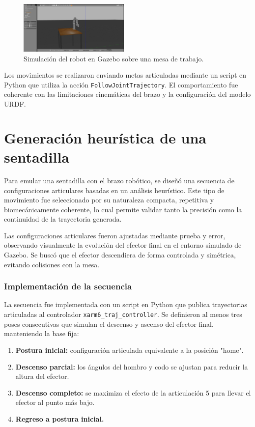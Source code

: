 \documentclass[conference]{IEEEtran}
\begin{document}
\begin{figure}[H]
    \centering
    \includegraphics[width=0.48\textwidth]{images/home.png}
    \caption{Simulación del robot en Gazebo sobre una mesa de trabajo.}
    \label{fig:gazebo_home}
\end{figure}

Los movimientos se realizaron enviando metas articuladas mediante un script en Python que utiliza la acción \texttt{FollowJointTrajectory}. El comportamiento fue coherente con las limitaciones cinemáticas del brazo y la configuración del modelo URDF.

\section{Generación heurística de una sentadilla}

Para emular una sentadilla con el brazo robótico, se diseñó una secuencia de configuraciones articulares basadas en un análisis heurístico. Este tipo de movimiento fue seleccionado por su naturaleza compacta, repetitiva y biomecánicamente coherente, lo cual permite validar tanto la precisión como la continuidad de la trayectoria generada.

Las configuraciones articulares fueron ajustadas mediante prueba y error, observando visualmente la evolución del efector final en el entorno simulado de Gazebo. Se buscó que el efector descendiera de forma controlada y simétrica, evitando colisiones con la mesa.

\subsubsection*{Implementación de la secuencia}

La secuencia fue implementada con un script en Python que publica trayectorias articuladas al controlador \texttt{xarm6\_traj\_controller}. Se definieron al menos tres poses consecutivas que simulan el descenso y ascenso del efector final, manteniendo la base fija:

\begin{enumerate}
    \item \textbf{Postura inicial:} configuración articulada equivalente a la posición "home".
    \item \textbf{Descenso parcial:} los ángulos del hombro y codo se ajustan para reducir la altura del efector.
    \item \textbf{Descenso completo:} se maximiza el efecto de la articulación 5 para llevar el efector al punto más bajo.
    \item \textbf{Regreso a postura inicial.}
\end{enumerate}
\end{document}
